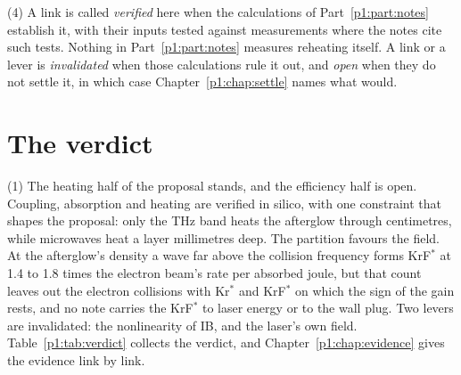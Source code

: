 {\noindent}(4) A link is called \emph{verified} here when the calculations of
Part~\ref{p1:part:notes} establish it, with their inputs tested against measurements
where the notes cite such tests. Nothing in Part~\ref{p1:part:notes} measures
reheating itself. A link or a lever is \emph{invalidated} when those calculations
rule it out, and \emph{open} when they do not settle it, in which case
Chapter~\ref{p1:chap:settle} names what would.

\section{The verdict}
\label{p1:sec:verdict}

{\noindent}(1) The heating half of the proposal stands, and the efficiency half is
open. Coupling, absorption and heating are verified in silico, with one constraint
that shapes the proposal: only the THz band heats the afterglow through
centimetres, while microwaves heat a layer millimetres deep. The partition favours
the field. At the afterglow's density a wave far above the collision frequency
forms KrF$^*$ at 1.4 to 1.8 times the electron beam's rate per absorbed joule, but
that count leaves out the electron collisions with Kr$^*$ and KrF$^*$ on which the
sign of the gain rests, and no note carries the KrF$^*$ to laser energy or to the
wall plug. Two levers are invalidated: the nonlinearity of IB, and the laser's own
field. Table~\ref{p1:tab:verdict} collects the verdict, and
Chapter~\ref{p1:chap:evidence} gives the evidence link by link.

